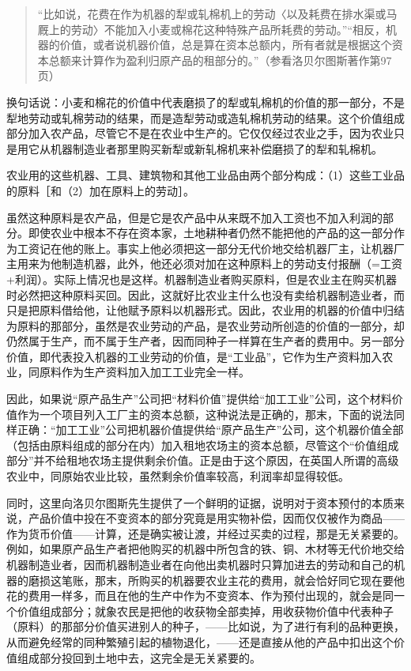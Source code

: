 \begin{quote}{“比如说，花费在作为机器的犁或轧棉机上的劳动〈以及耗费在排水渠或马厩上的劳动〉不能加入小麦或棉花这种特殊产品所耗费的劳动。”“相反，机器的价值，或者说机器价值，总是算在资本总额内，所有者就是根据这个资本总额来计算作为盈利归原产品的租部分的。”（参看洛贝尔图斯著作第97页）}\end{quote}

换句话说：小麦和棉花的价值中代表磨损了的犁或轧棉机的价值的那一部分，不是犁地劳动或轧棉劳动的结果，而是造犁劳动或造轧棉机劳动的结果。这个价值组成部分加入农产品，尽管它不是在农业中生产的。它仅仅经过农业之手，因为农业只是用它从机器制造业者那里购买新犁或新轧棉机来补偿磨损了的犁和轧棉机。

农业用的这些机器、工具、建筑物和其他工业品由两个部分构成：（1）这些工业品的原料［和（2）加在原料上的劳动］。

虽然这种原料是农产品，但是它是农产品中从来既不加入工资也不加入利润的部分。即使农业中根本不存在资本家，土地耕种者仍然不能把他的产品的这一部分作为工资记在他的账上。事实上他必须把这一部分无代价地交给机器厂主，让机器厂主用来为他制造机器，此外，他还必须对加在这种原料上的劳动支付报酬（=工资+利润）。实际上情况也是这样。机器制造业者购买原料，但是农业主在购买机器时必然把这种原料买回。因此，这就好比农业主什么也没有卖给机器制造业者，而只是把原料借给他，让他赋予原料以机器形式。因此，农业用的机器的价值中归结为原料的那部分，虽然是农业劳动的产品，是农业劳动所创造的价值的一部分，却仍然属于生产，而不属于生产者，因而同种子一样算在生产者的费用中。另一部分价值，即代表投入机器的工业劳动的价值，是“工业品”，它作为生产资料加入农业，同原料作为生产资料加入加工工业完全一样。

因此，如果说“原产品生产”公司把“材料价值”提供给“加工工业”公司，这个材料价值作为一个项目列入工厂主的资本总额，这种说法是正确的，那末，下面的说法同样正确：“加工工业”公司把机器价值提供给“原产品生产”公司，这个机器价值全部（包括由原料组成的部分在内）加入租地农场主的资本总额，尽管这个“价值组成部分”并不给租地农场主提供剩余价值。正是由于这个原因，在英国人所谓的高级农业中，同原始农业比较，虽然剩余价值率较高，利润率却显得较低。

同时，这里向洛贝尔图斯先生提供了一个鲜明的证据，说明对于资本预付的本质来说，产品价值中投在不变资本的部分究竟是用实物补偿，因而仅仅被作为商品——作为货币价值——计算，还是确实被让渡，并经过买卖的过程，那是无关紧要的。例如，如果原产品生产者把他购买的机器中所包含的铁、铜、木材等无代价地交给机器制造业者，因而机器制造业者在向他出卖机器时只算加进去的劳动和自己的机器的磨损这笔账，那末，所购买的机器要农业主花的费用，就会恰好同它现在要他花的费用一样多，而且在他的生产中作为不变资本、作为预付出现的，就会是同一个价值组成部分；就象农民是把他的收获物全部卖掉，用收获物价值中代表种子（原料）的那部分价值买进别人的种子，——比如说，为了进行有利的品种更换，从而避免经常的同种繁殖引起的植物退化，——还是直接从他的产品中扣出这个价值组成部分投回到土地中去，这完全是无关紧要的。

